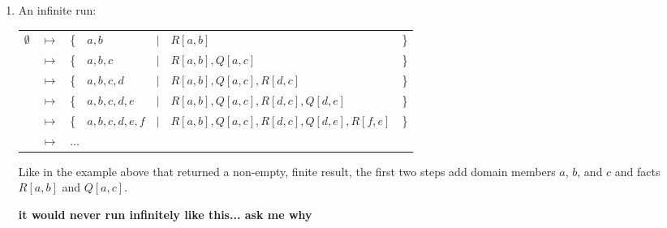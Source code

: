 \begin{enumerate}
		\item An infinite run:

			\begin{tabular}{lllllll}
				$\emptyset$ & $\mapsto$ & \{ & $a,b$         & $|$ & $R[a,b]$                                 & \} \\
				{}          & $\mapsto$ & \{ & $a,b,c$       & $|$ & $R[a,b], Q[a,c]$                         & \} \\
				{}          & $\mapsto$ & \{ & $a,b,c,d$     & $|$ & $R[a,b], Q[a,c], R[d,c]$                 & \} \\
				{}          & $\mapsto$ & \{ & $a,b,c,d,e$   & $|$ & $R[a,b], Q[a,c], R[d,c], Q[d,e]$         & \} \\
				{}          & $\mapsto$ & \{ & $a,b,c,d,e,f$ & $|$ & $R[a,b], Q[a,c], R[d,c], Q[d,e], R[f,e]$ & \} \\
				{}          & $\mapsto$ & \multicolumn{5}{l}{ $\ldots$ } \\
			\end{tabular}

			Like in the example above that returned a non-empty, finite result,
			the first two steps add domain members $a$, $b$, and $c$ and facts
			$R[a,b]$ and $Q[a,c]$.

			\textbf{it would never run infinitely like this... ask me why}

		\end{enumerate}
